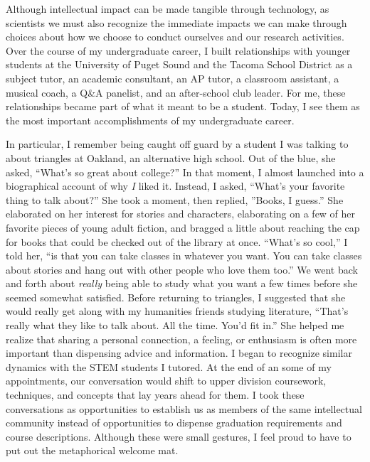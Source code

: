 Although intellectual impact can be made tangible through technology, as scientists we must also recognize the immediate impacts we can make through choices about how we choose to conduct ourselves and our research activities.
Over the course of my undergraduate career, I built relationships with younger students at the University of Puget Sound and the Tacoma School District as a subject tutor, an academic consultant, an AP tutor, a classroom assistant, a musical coach, a Q\&A panelist, and an after-school club leader.
For me, these relationships became part of what it meant to be a student.
Today, I see them as the most important accomplishments of my undergraduate career.

In particular, I remember being caught off guard by a student I was talking to about triangles at Oakland, an alternative high school.
Out of the blue, she asked, ``What's so great about college?''
In that moment, I almost launched into a biographical account of why \textit{I} liked it.
Instead, I asked, ``What's your favorite thing to talk about?''
She took a moment, then replied, ''Books, I guess.''
She elaborated on her interest for stories and characters, elaborating on a few of her favorite pieces of young adult fiction, and bragged a little about reaching the cap for books that could be checked out of the library at once.
``What's so cool,'' I told her, ``is that you can take classes in whatever you want.
You can take classes about stories and hang out with other people who love them too.''
We went back and forth about \textit{really} being able to study what you want a few times before she seemed somewhat satisfied.
Before returning to triangles, I suggested that she would really get along with my humanities friends studying literature,
``That's really what they like to talk about.
All the time.
You'd fit in.''
She helped me realize that sharing a personal connection, a feeling, or enthusiasm is often more important than dispensing advice and information.
I began to recognize similar dynamics with the STEM students I tutored.
At the end of an some of my appointments, our conversation would shift to upper division coursework, techniques, and concepts that lay years ahead for them.
I took these conversations as opportunities to establish us as members of the same intellectual community instead of opportunities to dispense graduation requirements and course descriptions.
Although these were small gestures, I feel proud to have to put out the metaphorical welcome mat.

